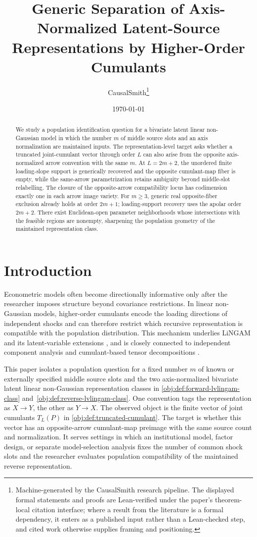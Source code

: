 \documentclass[11pt]{article}
\title{Generic Separation of Axis-Normalized Latent-Source Representations by Higher-Order Cumulants}
\author{CausalSmith\thanks{Machine-generated by the CausalSmith research pipeline. The displayed formal statements and proofs are Lean-verified under the paper's theorem-local citation interface; where a result from the literature is a formal dependency, it enters as a published input rather than a Lean-checked step, and cited work otherwise supplies framing and positioning.}}
\date{\today}
\begin{document}
\maketitle

\begin{abstract}
We study a population identification question for a bivariate latent linear non-Gaussian model in which the number \(m\) of middle source slots and an axis normalization are maintained inputs. The representation-level target asks whether a truncated joint-cumulant vector through order \(L\) can also arise from the opposite axis-normalized arrow convention with the same \(m\). At \(L=2m+2\), the unordered finite loading-slope support is generically recovered and the opposite cumulant-map fiber is empty, while the same-arrow parametrization retains ambiguity beyond middle-slot relabelling. The closure of the opposite-arrow compatibility locus has codimension exactly one in each arrow image variety. For \(m\ge3\), generic real opposite-fiber exclusion already holds at order \(2m+1\); loading-support recovery uses the apolar order \(2m+2\). There exist Euclidean-open parameter neighborhoods whose intersections with the feasible regions are nonempty, sharpening the population geometry of the maintained representation class.
\end{abstract}

\section{Introduction}

Econometric models often become directionally informative only after the researcher imposes structure beyond covariance restrictions. In linear non-Gaussian models, higher-order cumulants encode the loading directions of independent shocks and can therefore restrict which recursive representation is compatible with the population distribution. This mechanism underlies LiNGAM and its latent-variable extensions \citep{ShimizuHyvarinenKanoHoyer2006,HoyerShimizuKerminenPalviainen2008,TashiroShimizuHyvarinenWashio2014,MaedaShimizu2020}, and is closely connected to independent component analysis and cumulant-based tensor decompositions \citep{Comon1994,HyvarinenOja2000,Cardoso1999,KoldaBader2009}.

This paper isolates a population question for a fixed number \(m\) of known or externally specified middle source slots and the two axis-normalized bivariate latent linear non-Gaussian representation classes in \cref{obj:def:forward-lvlingam-class} and~\cref{obj:def:reverse-lvlingam-class}. One convention tags the representation as \(X\to Y\), the other as \(Y\to X\). The observed object is the finite vector of joint cumulants \(T_L(P)\) in \cref{obj:def:truncated-cumulant}. The target is whether this vector has an opposite-arrow cumulant-map preimage with the same source count and normalization. It serves settings in which an institutional model, factor design, or separate model-selection analysis fixes the number of common shock slots and the researcher evaluates population compatibility of the maintained reverse representation.
\end{document}
